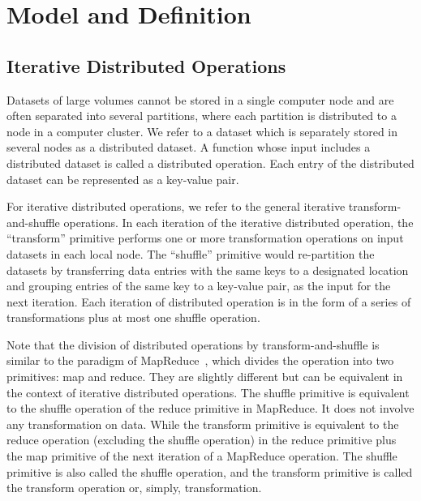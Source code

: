 \documentclass[10pt,journal,compsoc]{IEEEtran}
\begin{document}
\section{Model and Definition}\label{section:background}
\subsection{Iterative Distributed Operations}
Datasets of large volumes cannot be stored in a single computer node
and are often separated into several partitions, 
where each partition is distributed to a node in a computer cluster. 
We refer to a dataset which is separately stored in several nodes as a distributed dataset. 
A function whose input includes a distributed dataset is called a distributed operation.
Each entry of the distributed dataset can be represented as a key-value pair. 


For iterative distributed
operations, we refer to the general iterative transform-and-shuffle operations. 
In each iteration of the iterative distributed operation, 
the ``transform'' primitive performs one or more transformation operations on 
input datasets in each local node.
The ``shuffle'' primitive would
re-partition the datasets by transferring data entries with
the same keys to a designated location and grouping entries of the same key to a key-value pair, as the input for the next iteration. 
Each iteration of distributed operation is in the form of a series of transformations plus at most one shuffle operation.

Note that the division of distributed operations by transform-and-shuffle is similar to the paradigm of 
MapReduce~\cite{dean2008mapreduce}, which divides the operation into two primitives: map and reduce.
They are slightly different but can be equivalent in the context of iterative distributed operations.  
The shuffle primitive is equivalent to the shuffle operation of the reduce primitive in MapReduce. 
It does not involve any transformation on data.
While the transform primitive is equivalent to the reduce operation
(excluding the shuffle operation) in the reduce primitive plus the map primitive of the next iteration of a MapReduce operation. 
The shuffle primitive is also called the shuffle operation,
and the transform primitive is called the transform operation or, simply, 
transformation.
\end{document}
